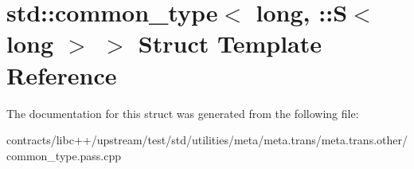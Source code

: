 \hypertarget{structstd_1_1common__type_3_01long_00_01_1_1_s_3_01long_01_4_01_4}{}\section{std\+:\+:common\+\_\+type$<$ long, \+:\+:S$<$ long $>$ $>$ Struct Template Reference}
\label{structstd_1_1common__type_3_01long_00_01_1_1_s_3_01long_01_4_01_4}


The documentation for this struct was generated from the following file\+:\begin{DoxyCompactItemize}
\item 
contracts/libc++/upstream/test/std/utilities/meta/meta.\+trans/meta.\+trans.\+other/common\+\_\+type.\+pass.\+cpp\end{DoxyCompactItemize}
